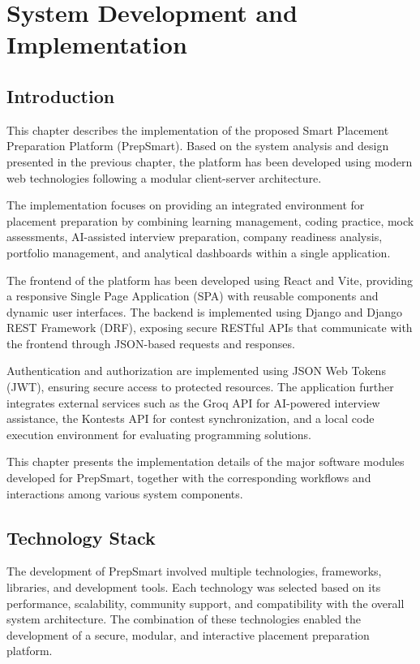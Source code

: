 \chapter{System Development and Implementation}

\section{Introduction}

This chapter describes the implementation of the proposed Smart Placement Preparation Platform (PrepSmart). Based on the system analysis and design presented in the previous chapter, the platform has been developed using modern web technologies following a modular client-server architecture.

The implementation focuses on providing an integrated environment for placement preparation by combining learning management, coding practice, mock assessments, AI-assisted interview preparation, company readiness analysis, portfolio management, and analytical dashboards within a single application.

The frontend of the platform has been developed using React and Vite, providing a responsive Single Page Application (SPA) with reusable components and dynamic user interfaces. The backend is implemented using Django and Django REST Framework (DRF), exposing secure RESTful APIs that communicate with the frontend through JSON-based requests and responses.

Authentication and authorization are implemented using JSON Web Tokens (JWT), ensuring secure access to protected resources. The application further integrates external services such as the Groq API for AI-powered interview assistance, the Kontests API for contest synchronization, and a local code execution environment for evaluating programming solutions.

This chapter presents the implementation details of the major software modules developed for PrepSmart, together with the corresponding workflows and interactions among various system components.

\section{Technology Stack}

The development of PrepSmart involved multiple technologies, frameworks, libraries, and development tools. Each technology was selected based on its performance, scalability, community support, and compatibility with the overall system architecture. The combination of these technologies enabled the development of a secure, modular, and interactive placement preparation platform.

